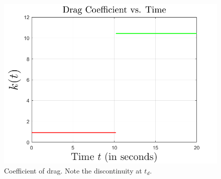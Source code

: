 \documentclass{article}
\begin{document}
    \begin{figure}[H]
        \centering
        \begin{minipage}{0.45\textwidth}
            \centering
            \includegraphics[scale = 0.45]{instantkplot}
            \caption{Coefficient of drag. Note the discontinuity at $t_d$.}
        \end{minipage}


\end{figure}
\end{document}
